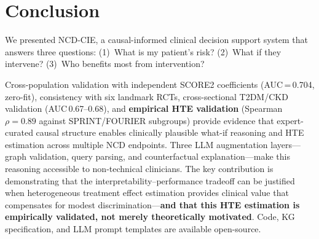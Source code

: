 \documentclass[runningheads]{llncs}
\begin{document}
\section{Conclusion}\label{sec:conclusion}

We presented NCD-CIE, a causal-informed clinical decision support
system that answers three questions:
(1)~What is my patient's risk?
(2)~What if they intervene?
(3)~Who benefits most from intervention?

Cross-population validation with independent SCORE2 coefficients
(AUC\,=\,0.704, zero-fit), consistency with six landmark RCTs,
cross-sectional T2DM/CKD validation (AUC\,0.67--0.68), and
\textbf{empirical HTE validation} (Spearman $\rho = 0.89$ against
SPRINT/FOURIER subgroups) provide evidence that expert-curated
causal structure enables clinically plausible what-if reasoning
and HTE estimation across multiple NCD endpoints.
Three LLM augmentation layers---graph validation, query parsing,
and counterfactual explanation---make this reasoning accessible
to non-technical clinicians.
The key contribution is demonstrating that the interpretability--performance
tradeoff can be justified when heterogeneous treatment effect
estimation provides clinical value that compensates for modest
discrimination---\textbf{and that this HTE estimation is empirically
validated, not merely theoretically motivated}.
Code, KG specification, and LLM prompt templates are available
open-source.
\end{document}
